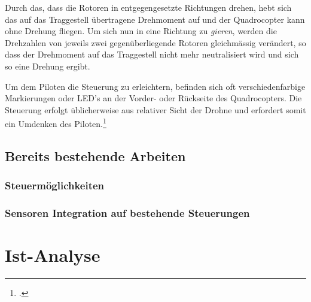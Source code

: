 Durch das, dass die Rotoren in entgegengesetzte Richtungen drehen, hebt sich das auf das Traggestell übertragene Drehmoment auf und der Quadrocopter kann ohne Drehung fliegen.
Um sich nun in eine Richtung zu \textit{gieren}, werden die Drehzahlen von jeweils zwei gegenüberliegende Rotoren gleichmässig verändert, so dass der Drehmoment auf das Traggestell nicht mehr neutralisiert wird und sich so eine Drehung ergibt.

Um dem Piloten die Steuerung zu erleichtern, befinden sich oft verschiedenfarbige Markierungen oder LED's an der Vorder- oder Rückseite des Quadrocopters.
Die Steuerung erfolgt üblicherweise aus relativer Sicht der Drohne und erfordert somit ein Umdenken des Piloten.\footcite{Quadrocopter__Wikipedia_2015-03-22}


\subsection{Bereits bestehende Arbeiten}
\subsubsection{Steuermöglichkeiten}

\subsubsection{Sensoren Integration auf bestehende Steuerungen}

\section{Ist-Analyse}

